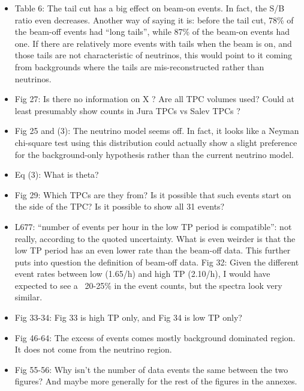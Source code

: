 \documentclass[11pt]{article}
\begin{document}
\begin{itemize}
    \item Table 6: The tail cut has a big effect on beam-on events. In fact, the S/B ratio even decreases. Another way of saying it is: before the tail cut, 78\% of the beam-off events had “long tails”, while 87\% of the beam-on events had one. If there are relatively more events with tails when the beam is on, and those tails are not characteristic of neutrinos, this would point to it coming from backgrounds where the tails are mis-reconstructed rather than neutrinos.
    \item Fig 27: Is there no information on X ? Are all TPC volumes used? Could at least presumably show counts in Jura TPCs vs Salev TPCs ?
    \item Fig 25 and (3): The neutrino model seems off. In fact, it looks like a Neyman chi-square test using this distribution could actually show a slight preference for the background-only hypothesis rather than the current neutrino model.
    \item Eq (3): What is theta?
    \item Fig 29: Which TPCs are they from? Is it possible that such events start on the side of the TPC? Is it possible to show all 31 events?
    \item L677: “number of events per hour in the low TP period is compatible”: not really, according to the quoted uncertainty. What is even weirder is that the low TP period has an even lower rate than the beam-off data. This further puts into question the definition of beam-off data. Fig 32: Given the different event rates between low (1.65/h) and high TP (2.10/h), I would have expected to see a ~20-25\% in the event counts, but the spectra look very similar.
    \item Fig 33-34: Fig 33 is high TP only, and Fig 34 is low TP only?
    \item Fig 46-64: The excess of events comes mostly background dominated region. It does not come from the neutrino region.
    \item Fig 55-56: Why isn’t the number of data events the same between the two figures? And maybe more generally for the rest of the figures in the annexes.
\end{itemize}
\end{document}

